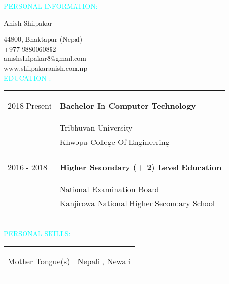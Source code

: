 \documentclass[12pt]{article}
\begin{document}
\begin{flushleft}
\textcolor{cyan}{PERSONAL INFORMATION:}\\
\begin{large}
Anish Shilpakar\\
\end{large}
 44800, Bhaktapur (Nepal)\\
 +977-9880060862\\
 anishshilpakar8@gmail.com\\
 www.shilpakaranish.com.np\\
 \vspace{0.75in}
\textcolor{cyan}{EDUCATION  :}\\
\bigskip
\begin{tabular}{ll}
2018-Present & \hspace{1in}\begin{large}
\textbf{Bachelor In Computer Technology}
\end{large}\\
&  \hspace{1in} Tribhuvan University\\
&  \hspace{1in}  Khwopa College Of Engineering\\\\
2016 - 2018 &  \hspace{1in} \begin{large}
\textbf{Higher Secondary (+ 2) Level Education}
\end{large}\\
&  \hspace{1in} National Examination Board\\
&  \hspace{1in} Kanjirowa National Higher Secondary School\\
\end{tabular}\\
\vspace{0.75in}
\textcolor{cyan}{PERSONAL SKILLS: }\\
\bigskip
\begin{tabular}{ll}

\begin{large} Mother Tongue(s) \end{large} & \hspace{0.5in} \begin{large}Nepali , Newari \end{large}\\\\


\end{tabular}
\end{flushleft}
\end{document}
